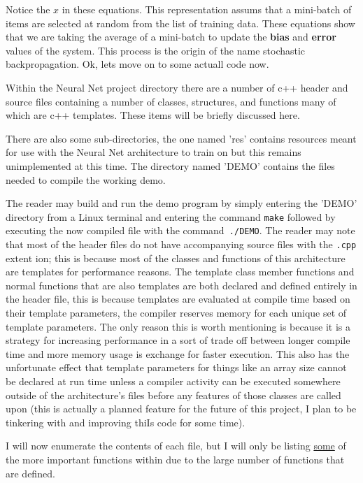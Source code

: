 \documentclass[a4paper,10pt]{article}
\begin{document}
Notice the $x$ in these equations. This representation assums that a mini-batch of items are selected at random from the
list of training data.  These equations show that we are taking the average of a mini-batch to update the \textbf{bias} and
\textbf{error} values of the system.
This process is the origin of the name stochastic backpropagation. Ok, lets move on to some actuall code now.

Within the Neural Net project directory there are a number of \textmd{c++} header and source files containing a number
of classes, structures, and functions many of which are \textmd{c++} templates.  These items will be briefly discussed
here.

There are also some sub-directories, the one named 'res' contains resources meant for use with the Neural Net
architecture to train on but this remains unimplemented at this time. The directory named 'DEMO' contains the files
needed to compile the working demo.

The reader may build and run the demo program by simply entering the 'DEMO' directory from a Linux terminal and entering
the command \texttt{make} followed by executing the now compiled file with the command\texttt{ ./DEMO}.
The reader may note that most of the header files do not have accompanying source files with the \texttt{.cpp} extent
ion; this is because most of the classes and functions of this architecture are templates for performance reasons.  The
template class member functions  and normal functions that are also templates are both declared and defined entirely in
the header file, this is because templates are evaluated at compile time based on their template parameters, the
compiler reserves memory for each unique set of template parameters. The only reason this is worth mentioning is because
it is a strategy for increasing performance in a sort of trade off between longer compile time and more memory usage is
exchange for faster execution. This also has the unfortunate effect that template parameters for things like an array
size cannot be declared at run time unless a compiler activity can be executed somewhere outside of the architecture's
files before any features of those classes are called upon (this is actually a planned feature for the future of this
project, I plan to be tinkering with and improving thiIs code for some time).

I will now enumerate the contents of each file, but I will only be listing \underline{some} of the more important
functions within due to the large number of functions that are defined.
\end{document}
